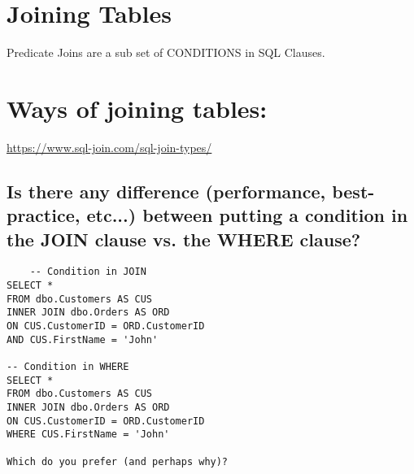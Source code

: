 \section{Joining Tables}

Predicate Joins are a sub set of CONDITIONS in SQL Clauses.

\section{Ways of joining tables:}
\url{https://www.sql-join.com/sql-join-types/}

\subsection{Is there any difference (performance, best-practice, etc...) between putting a condition in the JOIN clause vs. the WHERE clause?}

\begin{verbatim}
    -- Condition in JOIN
SELECT *
FROM dbo.Customers AS CUS
INNER JOIN dbo.Orders AS ORD 
ON CUS.CustomerID = ORD.CustomerID
AND CUS.FirstName = 'John'

-- Condition in WHERE
SELECT *
FROM dbo.Customers AS CUS
INNER JOIN dbo.Orders AS ORD 
ON CUS.CustomerID = ORD.CustomerID
WHERE CUS.FirstName = 'John'

Which do you prefer (and perhaps why)?

\end{verbatim}
